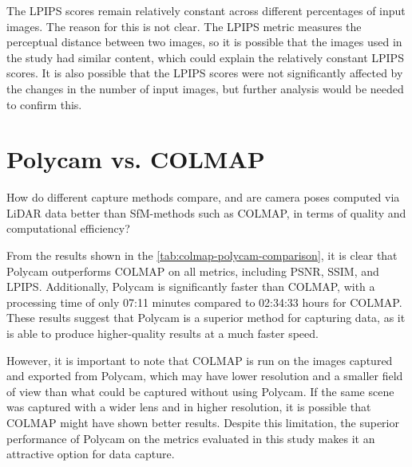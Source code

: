 The LPIPS scores remain relatively constant across different percentages of input images. The reason for this is not clear. The LPIPS metric measures the perceptual distance between two images, so it is possible that the images used in the study had similar content, which could explain the relatively constant LPIPS scores. It is also possible that the LPIPS scores were not significantly affected by the changes in the number of input images, but further analysis would be needed to confirm this.




\section{Polycam vs. COLMAP}
\begin{description}[leftmargin=!,labelwidth=\widthof{RQ 1:}]
\item[\textbf{RQ 3:}]
How do different capture methods compare, and are camera poses computed via LiDAR data better than SfM-methods such as COLMAP, in terms of quality and computational efficiency?
\end{description}


From the results shown in the \autoref{tab:colmap-polycam-comparison}, it is clear that Polycam outperforms COLMAP on all metrics, including PSNR, SSIM, and LPIPS. Additionally, Polycam is significantly faster than COLMAP, with a processing time of only 07:11 minutes compared to 02:34:33 hours for COLMAP. These results suggest that Polycam is a superior method for capturing data, as it is able to produce higher-quality results at a much faster speed.

However, it is important to note that COLMAP is run on the images captured and exported from Polycam, which may have lower resolution and a smaller field of view than what could be captured without using Polycam. If the same scene was captured with a wider lens and in higher resolution, it is possible that COLMAP might have shown better results. Despite this limitation, the superior performance of Polycam on the metrics evaluated in this study makes it an attractive option for data capture.

